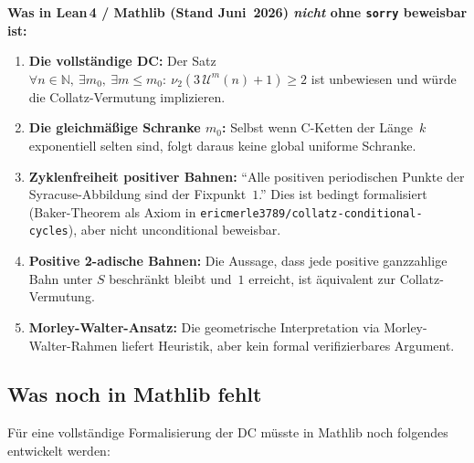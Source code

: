 \documentclass[12pt,a4paper]{article}
\newcommand{\vii}{\nu_2}
\newcommand{\U}{\mathcal{U}}
\newcommand{\N}{\mathbb{N}}
\newcommand{\Syr}{S}
\begin{document}
\begin{tcolorbox}[lücke]
\textbf{Was in Lean\,4 / Mathlib (Stand Juni~2026) \emph{nicht} ohne \texttt{sorry} beweisbar ist:}

\begin{enumerate}[label=(\arabic*)]
  \item \textbf{Die vollständige DC:}
    Der Satz $\forall n \in \N,\ \exists m_0,\ \exists m \leq m_0:\
    \vii(3\,\U^m(n)+1) \geq 2$
    ist unbewiesen und würde die Collatz-Vermutung implizieren.

  \item \textbf{Die gleichmäßige Schranke $m_0$:}
    Selbst wenn C-Ketten der Länge~$k$ exponentiell selten sind,
    folgt daraus keine global uniforme Schranke.

  \item \textbf{Zyklenfreiheit positiver Bahnen:}
    ``Alle positiven periodischen Punkte der Syracuse-Abbildung
    sind der Fixpunkt~$1$.''
    Dies ist bedingt formalisiert (Baker-Theorem als Axiom in
    \texttt{ericmerle3789/collatz-conditional-cycles}),
    aber nicht unconditional beweisbar.

  \item \textbf{Positive 2-adische Bahnen:}
    Die Aussage, dass jede positive ganzzahlige Bahn
    unter $\Syr$ beschränkt bleibt und~$1$ erreicht,
    ist äquivalent zur Collatz-Vermutung.

  \item \textbf{Morley-Walter-Ansatz:}
    Die geometrische Interpretation via Morley-Walter-Rahmen
    liefert Heuristik, aber kein formal verifizierbares Argument.
\end{enumerate}
\end{tcolorbox}

\subsection{Was noch in Mathlib fehlt}

Für eine vollständige Formalisierung der DC müsste in Mathlib noch
folgendes entwickelt werden:
\end{document}

